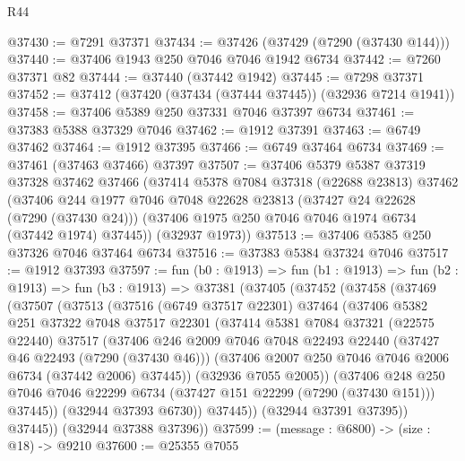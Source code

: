 \begin{lexlean}{R44}
\begin{coremodule}
{@37430 := @7291 @37371
@37434 := @37426 (@37429 (@7290 (@37430 @144)))
@37440 := @37406 @1943 @250 @7046 @7046 @1942 @6734
@37442 := @7260 @37371 @82
@37444 := @37440 (@37442 @1942)
@37445 := @7298 @37371
@37452 := @37412 (@37420 (@37434 (@37444 @37445)) (@32936 @7214 @1941))
@37458 := @37406 @5389 @250 @37331 @7046 @37397 @6734
@37461 := @37383 @5388 @37329 @7046
@37462 := @1912 @37391
@37463 := @6749 @37462
@37464 := @1912 @37395
@37466 := @6749 @37464 @6734
@37469 := @37461 (@37463 @37466) @37397
@37507 := @37406
    @5379
    @5387
    @37319
    @37328
    @37462
    @37466
    (@37414
      @5378
      @7084
      @37318
      (@22688 @23813)
      @37462
      (@37406
        @244
        @1977
        @7046
        @7048
        @22628
        @23813
        (@37427 @24 @22628 (@7290 (@37430 @24)))
        (@37406 @1975 @250 @7046 @7046 @1974 @6734 (@37442 @1974) @37445))
      (@32937 @1973))
@37513 := @37406 @5385 @250 @37326 @7046 @37464 @6734
@37516 := @37383 @5384 @37324 @7046
@37517 := @1912 @37393
@37597 := fun (b0 : @1913) =>
  fun (b1 : @1913) =>
  fun (b2 : @1913) =>
  fun (b3 : @1913) =>
  @37381
    (@37405
      (@37452
        (@37458
          (@37469
            (@37507
              (@37513
                (@37516
                  (@6749 @37517 @22301)
                  @37464
                  (@37406
                    @5382
                    @251
                    @37322
                    @7048
                    @37517
                    @22301
                    (@37414
                      @5381
                      @7084
                      @37321
                      (@22575 @22440)
                      @37517
                      (@37406
                        @246
                        @2009
                        @7046
                        @7048
                        @22493
                        @22440
                        (@37427 @46 @22493 (@7290 (@37430 @46)))
                        (@37406 @2007 @250 @7046 @7046 @2006 @6734 (@37442 @2006) @37445))
                      (@32936 @7055 @2005))
                    (@37406
                      @248
                      @250
                      @7046
                      @7046
                      @22299
                      @6734
                      (@37427 @151 @22299 (@7290 (@37430 @151)))
                      @37445))
                  (@32944 @37393 @6730))
                @37445))
            (@32944 @37391 @37395))
          @37445))
      (@32944 @37388 @37396))
@37599 := (message : @6800) -> (size : @18) -> @9210
@37600 := @25355 @7055
}
\end{coremodule}
\end{lexlean}
